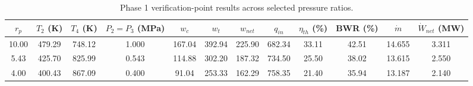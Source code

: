 \begin{table}[htbp]
    \centering
    \caption{Phase 1 verification-point results across selected pressure ratios.}
    \label{tab:phase1_verification_points}
    \begin{tabular}{cccccccccccc}
        \hline
        $r_p$ & $T_2$ (K) & $T_4$ (K) & $P_2=P_3$ (MPa) & $w_c$ & $w_t$ & $w_{net}$ & $q_{in}$ & $\eta_{th}$ (\%) & BWR (\%) & $\dot{m}$ & $\dot{W}_{net}$ (MW) \\
        \hline
        10.00 & 479.29 & 748.12 & 1.000 & 167.04 & 392.94 & 225.90 & 682.34 & 33.11 & 42.51 & 14.655 & 3.311 \\
        5.43 & 425.70 & 825.99 & 0.543 & 114.88 & 302.20 & 187.32 & 734.50 & 25.50 & 38.02 & 13.615 & 2.550 \\
        4.00 & 400.43 & 867.09 & 0.400 & 91.04 & 253.33 & 162.29 & 758.35 & 21.40 & 35.94 & 13.187 & 2.140 \\
        \hline
    \end{tabular}
\end{table}